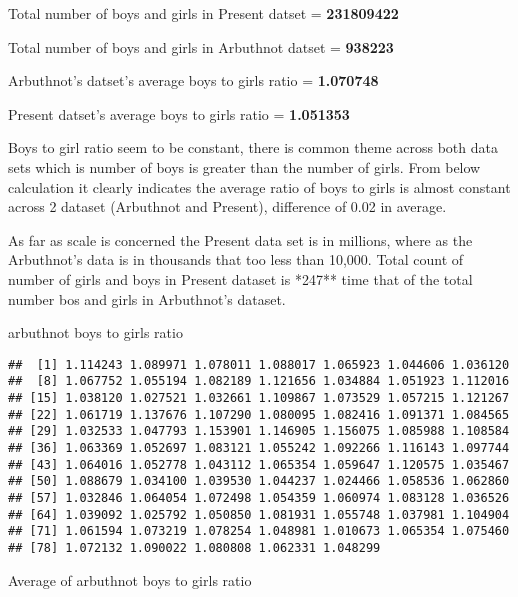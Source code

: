 \documentclass[]{article}
\newenvironment{Shaded}{\begin{snugshade}}{\end{snugshade}}
\newcommand{\NormalTok}[1]{#1}
\newcommand{\OperatorTok}[1]{\textcolor[rgb]{0.81,0.36,0.00}{\textbf{#1}}}
\newcommand{\StringTok}[1]{\textcolor[rgb]{0.31,0.60,0.02}{#1}}
\begin{document}
Total number of boys and girls in Present datset = \textbf{231809422}

Total number of boys and girls in Arbuthnot datset = \textbf{938223}

Arbuthnot's datset's average boys to girls ratio = \textbf{1.070748}

Present datset's average boys to girls ratio = \textbf{1.051353}

Boys to girl ratio seem to be constant, there is common theme across
both data sets which is number of boys is greater than the number of
girls. From below calculation it clearly indicates the average ratio of
boys to girls is almost constant across 2 dataset (Arbuthnot and
Present), difference of 0.02 in average.

As far as scale is concerned the Present data set is in millions, where
as the Arbuthnot's data is in thousands that too less than 10,000. Total
count of number of girls and boys in Present dataset is *247** time that
of the total number bos and girls in Arbuthnot's dataset.

arbuthnot boys to girls ratio

\begin{Shaded}
\end{Shaded}

\begin{verbatim}
##  [1] 1.114243 1.089971 1.078011 1.088017 1.065923 1.044606 1.036120
##  [8] 1.067752 1.055194 1.082189 1.121656 1.034884 1.051923 1.112016
## [15] 1.038120 1.027521 1.032661 1.109867 1.073529 1.057215 1.121267
## [22] 1.061719 1.137676 1.107290 1.080095 1.082416 1.091371 1.084565
## [29] 1.032533 1.047793 1.153901 1.146905 1.156075 1.085988 1.108584
## [36] 1.063369 1.052697 1.083121 1.055242 1.092266 1.116143 1.097744
## [43] 1.064016 1.052778 1.043112 1.065354 1.059647 1.120575 1.035467
## [50] 1.088679 1.034100 1.039530 1.044237 1.024466 1.058536 1.062860
## [57] 1.032846 1.064054 1.072498 1.054359 1.060974 1.083128 1.036526
## [64] 1.039092 1.025792 1.050850 1.081931 1.055748 1.037981 1.104904
## [71] 1.061594 1.073219 1.078254 1.048981 1.010673 1.065354 1.075460
## [78] 1.072132 1.090022 1.080808 1.062331 1.048299
\end{verbatim}

Average of arbuthnot boys to girls ratio
\end{document}
